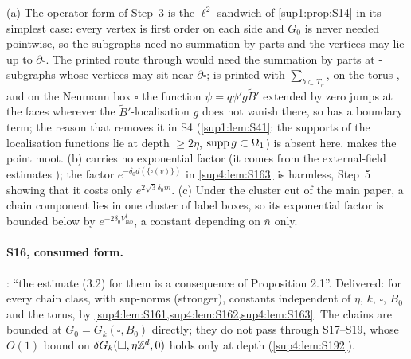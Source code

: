 \begin{remark}\label{sup4:rem:S16}
(a) The operator form of Step~3 is the $\ell^2$ sandwich of \cref{sup1:prop:S14} in its simplest case: every vertex is first order on each side and $G_0$ is never needed pointwise, so the subgraphs \cite[(2.4)]{Ba3} need no summation by parts and the vertices may lie up to $\partial\square$. The printed route through \cite[Prop.~2.1]{Ba3} would need the summation by parts \cite[(2.8)]{Ba3} at \cite[(2.4)]{Ba3}-subgraphs whose vertices may sit near $\partial\square$; \cite[(2.8)]{Ba3} is printed with $\sum_{b\subset T_\eta}$, on the torus \cite[p.~425]{Ba3}, and on the Neumann box $\square$ the function $\psi=q\phi'g\tilde B'$ extended by zero jumps at the faces wherever the $\tilde B'$-localisation $g$ does not vanish there, so \cite[(2.8)]{Ba3} has a boundary term; the reason that removes it in S4 (\cref{sup1:lem:S41}: the supports of the localisation functions lie at depth $\ge2\eta$, $\operatorname{supp} g\subset\Omega_1$) is absent here.  makes the point moot. (b) \cite[(3.2)]{Ba3} carries no exponential factor (it comes from the external-field estimates \cite[(2.5), (3.1)]{Ba3}); the factor $e^{-\delta_0d(\{\square(v)\})}$ in \cref{sup4:lem:S163} is harmless, Step~5 showing that it costs only $e^{2\sqrt3\delta_0m}$. (c) Under the cluster cut of the main paper, a chain component lies in one cluster of label boxes, so its exponential factor is bounded below by $e^{-2\delta_0V^\sharp_{\mathrm{lab}}}$, a constant depending on $\bar n$ only.
\end{remark}

\paragraph{S16, consumed form.} \cite[p.~433]{Ba3}: ``the estimate (3.2) for them is a consequence of Proposition 2.1''. Delivered: \cite[(3.2)]{Ba3} for every chain class, with sup-norms (stronger), constants independent of $\eta$, $k$, $\square$, $B_0$ and the torus, by \cref{sup4:lem:S161,sup4:lem:S162,sup4:lem:S163}. The chains are bounded at $G_0=G_k(\square,B_0)$ directly; they do not pass through S17--S19, whose $O(1)$ bound on $\delta G_k(\square,\eta\mathbb Z^d,0)$ holds only at depth (\cref{sup4:lem:S192}).
